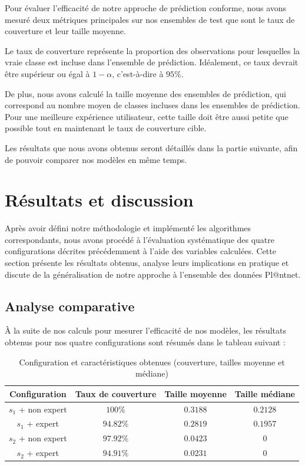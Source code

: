 \documentclass[a4paper,12pt]{article}
\begin{document}
Pour évaluer l'efficacité de notre approche de prédiction conforme, nous avons mesuré deux métriques principales sur nos ensembles de test que sont le taux de couverture et leur taille moyenne. 

\vspace{0.2cm}

Le taux de couverture représente la proportion des observations pour lesquelles la vraie classe est incluse dans l'ensemble de prédiction. Idéalement, ce taux devrait être supérieur ou égal à $1- \alpha$, c'est-à-dire à $95\%$.

\vspace{0.2cm}

De plus, nous avons calculé la taille moyenne des ensembles de prédiction, qui correspond au nombre moyen de classes incluses dans les ensembles de prédiction. Pour une meilleure expérience utilisateur, cette taille doit être aussi petite que possible tout en maintenant le taux de couverture cible.

\vspace{0.2cm}

Les résultats que nous avons obtenus seront détaillés dans la partie suivante, afin de pouvoir comparer nos modèles en même temps.

\section{Résultats et discussion}

Après avoir défini notre méthodologie et implémenté les algorithmes correspondants, nous avons procédé à l'évaluation systématique des quatre configurations décrites précédemment à l'aide des variables calculées. Cette section présente les résultats obtenus, analyse leurs implications en pratique et discute de la généralisation de notre approche à l'ensemble des données Pl@ntnet.

\subsection{Analyse comparative}

À la suite de nos calculs pour mesurer l'efficacité de nos modèles, les résultats obtenus pour nos quatre configurations sont résumés dans le tableau suivant :

\begin{table}[H]
\centering
\begin{tabular}{|c|c|c|c|}
    \hline
    Configuration & Taux de couverture & Taille moyenne & Taille médiane \\
    \hline
    $s_1$ + non expert & $100\%$ & $0.3188$ & $0.2128$ \\
    $s_1$ + expert & $94.82\%$ & $0.2819$ & $0.1957$ \\
    $s_2$ + non expert & $97.92\%$ & $0.0423$ & $0$ \\
    $s_2$ + expert & $94.91\%$ & $0.0231$ & $0$ \\
    \hline
    \end{tabular}
\caption{Configuration et caractéristiques obtenues (couverture, tailles moyenne et médiane)}
\end{table}
    
\end{document}
